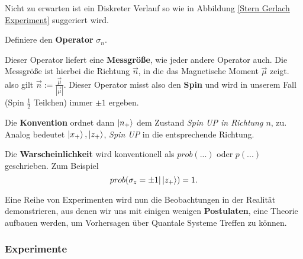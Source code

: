 \documentclass{article}
\begin{document}
\color{black}
Nicht zu erwarten ist ein Diskreter Verlauf so wie in Abbildung \ref{Stern Gerlach Experiment} suggeriert wird. 
\newline

Definiere den \textbf{Operator} $\sigma_n$.
\newline

Dieser Operator liefert eine \textbf{Messgröße},\color{gray} wie jeder andere Operator auch\color{black}. Die Messgröße ist hierbei die Richtung $\vec{n}$, in die das Magnetische Moment $\vec{\mu}$ zeigt.\color{gray} also gilt $\vec{n}:=\frac{\vec{\mu}}{|\vec{\mu}|}$\color{black}. Dieser Operator misst also den \textbf{Spin} und wird in unserem Fall (Spin $\frac{1}{2}$ Teilchen) immer $\pm 1$ ergeben.
\newline

Die \textbf{Konvention} ordnet dann $\ket{n_+}$ dem Zustand \textit{Spin UP in Richtung $n$}, zu. Analog bedeutet $\ket{x_+}, \ket{z_+}$, \textit{Spin UP} in die entsprechende Richtung.
\newline

Die \textbf{Warscheinlichkeit} wird konventionell als $prob(...)$ oder $p(...)$ geschrieben.\color{cyan} Zum Beispiel
\begin{equation}
 prob(\sigma_z = \pm 1| \ket{z_+}) = 1.
 \label{warscheilichkeit reiner zust}
\end{equation}
\newline

Eine Reihe von Experimenten wird nun die Beobachtungen in der Realität demonstrieren, aus denen wir uns mit einigen wenigen \textbf{Postulaten}, eine Theorie aufbauen werden, um Vorhersagen über Quantale Systeme Treffen zu können.
\color{black}


\subsubsection{Experimente}
\end{document}
